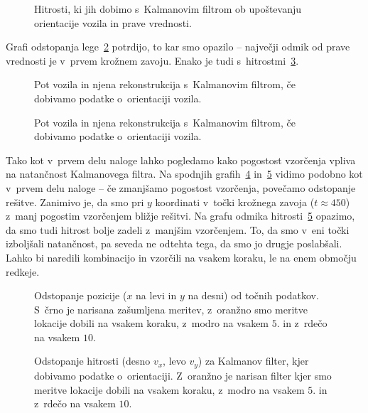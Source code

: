 \documentclass[a4paper,pdftex,10pt]{article}
\numberwithin{figure}{section} %
\begin{document}
\begin{figure}[H]
    \centering
    \resizebox{.49\linewidth}{!}{}
    \resizebox{.49\linewidth}{!}{}
    \caption{Hitrosti, ki jih dobimo s~Kalmanovim filtrom ob upoštevanju orientacije vozila
    in prave vrednosti.}
    \label{slika8b}
\end{figure}
Grafi odstopanja lege~\ref{slika9a} potrdijo, to kar smo opazilo -- največji odmik od prave
vrednosti je v~prvem krožnem zavoju. Enako je tudi s~hitrostmi~\ref{slika9b}.
\begin{figure}[H]
    \centering
    \resizebox{.49\linewidth}{!}{}
    \resizebox{.49\linewidth}{!}{}
    \caption{Pot vozila in njena rekonstrukcija s~Kalmanovim filtrom, če dobivamo podatke
    o~orientaciji vozila.}
    \label{slika9a}
\end{figure}
\begin{figure}[H]
    \centering
    \resizebox{.49\linewidth}{!}{}
    \resizebox{.49\linewidth}{!}{}
    \caption{Pot vozila in njena rekonstrukcija s~Kalmanovim filtrom, če dobivamo podatke
    o~orientaciji vozila.}
    \label{slika9b}
\end{figure}
Tako kot v~prvem delu naloge lahko pogledamo kako pogostost vzorčenja vpliva na natančnost
Kalmanovega filtra. Na spodnjih grafih~\ref{slika10a} in~\ref{slika10b} vidimo podobno kot
v~prvem delu naloge -- če zmanjšamo pogostost vzorčenja, povečamo odstopanje rešitve. 
Zanimivo je, da smo pri $y$ koordinati v~točki krožnega zavoja ($t\approx 450$) z~manj 
pogostim vzorčenjem bližje rešitvi. Na grafu odmika hitrosti~\ref{slika10b} opazimo, da
smo tudi hitrost bolje zadeli z~manjšim vzorčenjem. To, da smo v~eni točki izboljšali
natančnost, pa seveda ne odtehta tega, da smo jo drugje poslabšali. Lahko bi naredili 
kombinacijo in vzorčili na vsakem koraku, le na enem območju redkeje.
\begin{figure}[H]
    \centering
    \resizebox{.49\linewidth}{!}{}
    \resizebox{.49\linewidth}{!}{}
    \caption{Odstopanje pozicije ($x$ na levi in $y$ na desni) od točnih podatkov. S~črno
    je narisana zašumljena meritev, z~oranžno smo meritve lokacije dobili na vsakem koraku,
    z~modro na vsakem $5.$ in z~rdečo na vsakem $10.$}
    \label{slika10a}
\end{figure}
\begin{figure}[H]
    \centering
    \resizebox{.49\linewidth}{!}{}
    \resizebox{.49\linewidth}{!}{}
    \caption{Odstopanje hitrosti (desno $v_x$, levo $v_y$) za Kalmanov filter, kjer 
    dobivamo podatke o~orientaciji. Z~oranžno je narisan filter kjer smo meritve lokacije
    dobili na vsakem koraku, z~modro na vsakem $5.$ in z~rdečo na vsakem $10.$}
    \label{slika10b}
\end{figure}
\end{document}
